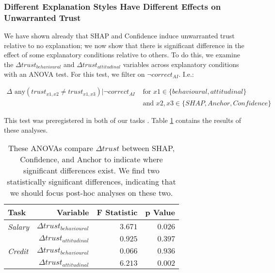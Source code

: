 \subsubsection{Different Explanation Styles Have Different Effects on Unwarranted Trust}
We have shown already that SHAP and Confidence induce unwarranted trust relative to no explanation; we now show that there is significant difference in the effect of some explanatory conditions relative to others. To do this, we examine the $\Delta trust_{behavioural}$ and $\Delta trust_{attitudinal}$ variables across explanatory conditions with an ANOVA test. For this test, we filter on $\neg correct_{AI}$. I.e.:

\begin{equation}
    \begin{split}
        \Delta \text{ any}(trust_{x1,x2} \neq trust_{x1,x3}) | \neg correct_{AI} & \text{ for } x1 \in \{behavioural, attitudinal\} \\
        & \text{ and } x2,x3 \in \{SHAP, Anchor, Confidence\}
    \end{split}
\end{equation}

\noindent This test was preregistered in both of our tasks \cite{natarajan_binns_2022}. Table \ref{tab:delta-trust-anova} contains the results of these analyses.

\begin{table}[htb]
    \centering
    \caption{These ANOVAs compare $\Delta trust$ between SHAP, Confidence, and Anchor to indicate where significant differences exist. We find two statistically significant differences, indicating that we should focus post-hoc analyses on these two.}
    \label{tab:delta-trust-anova}
    \begin{tabular}{lrrr}
        \toprule
        Task & Variable & F Statistic & p Value \\
        \midrule
        \emph{Salary} & $\Delta trust_{behavioural}$ & $\mathbf{3.671}$ & $\mathbf{0.026}$ \\
        & $\Delta trust_{attitudinal}$ & $0.925$ & $0.397$ \\
        \midrule
        \emph{Credit} & $\Delta trust_{behavioural}$ & $0.066$ & $0.936$ \\
        & $\Delta trust_{attitudinal}$ & $\mathbf{6.213}$ & $\mathbf{0.002}$ \\
        \bottomrule
    \end{tabular}
\end{table}


